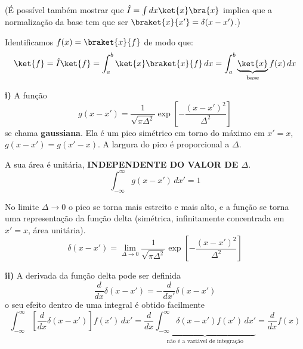 (É possível também mostrar que $\hat{I} = \int dx \ket{x}\bra{x}$ implica que a normalização da base tem que ser $\braket{x}{x'} = \delta(x-x')$.)

Identificamos $f(x) = \braket{x}{f}$ de modo que:
\begin{equation}
    \ket{f} = \hat{I}\ket{f} = \int_a^b \ket{x}\braket{x}{f}\, dx = \int_a^b \underbrace{\ket{x}}_{\text{base}} f(x)\, dx
\end{equation}


\textbf{i)} A função
\begin{equation}
    g(x-x') = \frac{1}{\sqrt{\pi \Delta^2}} \exp\left[-\frac{(x-x')^2}{\Delta^2}\right]
\end{equation}
se chama \textbf{gaussiana}. Ela é um pico simétrico em torno do máximo em $x' = x$, $g(x-x') = g(x'-x)$. A largura do pico é proporcional a $\Delta$.

A sua área é unitária, \textbf{INDEPENDENTE DO VALOR DE $\Delta$}.
\begin{equation}
    \int_{-\infty}^{\infty} g(x-x')\, dx' = 1
\end{equation}

No limite $\Delta \to 0$ o pico se torna mais estreito e mais alto, e a função se torna uma representação da função delta (simétrica, infinitamente concentrada em $x' = x$, área unitária).
\begin{equation}
    \boxed{\delta(x-x') = \lim_{\Delta \to 0} \frac{1}{\sqrt{\pi \Delta^2}} \exp\left[-\frac{(x-x')^2}{\Delta^2}\right]}
\end{equation}

\textbf{ii)} A derivada da função delta pode ser definida
\begin{equation}
    \frac{d}{dx}\delta(x-x') = -\frac{d}{dx'}\delta(x-x')
\end{equation}
o seu efeito dentro de uma integral é obtido facilmente
\begin{equation}
    \int_{-\infty}^{\infty} \left[\frac{d}{dx}\delta(x-x')\right] f(x')\, dx' = \frac{d}{dx}\underbrace{\int_{-\infty}^{\infty} \delta(x-x') f(x')\, dx'}_{\text{não é a variável de integração}} = \frac{d}{dx}f(x)
\end{equation}

